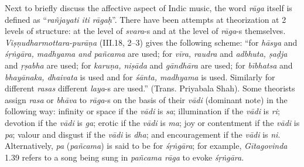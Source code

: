 Next to briefly discuss the affective aspect of Indic music, the word \textsl{rāga} itself is defined as “\textsl{rañjayati iti rāgaḥ}”. There have been attempts at theorization at 2 levels of structure: at the level of \textsl{svara}-s and at the level of \textsl{rāga}-s themselves. \textsl{Viṣṇudharmottara-purāṇa} (III.18, \hbox{2--3}) gives the following scheme: “for \textsl{hāsya} and \textsl{śṛṅgāra, madhyama and pañcama} are used; for \textsl{vīra, raudra} and \textsl{adbhuta, ṣaḍja} and \textsl{ṛṣabha} are used; for \textsl{karuṇa, niṣāda} and \textsl{gāndhāra} are used; for \textsl{bībhatsa} and \textsl{bhayānaka, dhaivata} is used and for \textsl{śānta, madhyama} is used. Similarly for different \textsl{rasas} different \textsl{laya}-s are used.” (Trans. Priyabala Shah). Some theorists assign \textsl{rasa} or \textsl{bhāva} to \textsl{rāga}-s on the basis of their \textsl{vādi} (dominant note) in the following way: infinity or space if the \textsl{vādi} is \textsl{sa}; illumination if the \textsl{vādi} is \textsl{ri}; devotion if the \textsl{vādi} is \textsl{ga}; erotic if the \textsl{vādi} is \textsl{ma}; joy or contentment if the \textsl{vādi} is \textsl{pa}; valour and disgust if the \textsl{vādi} is \textsl{dha}; and encouragement if the \textsl{vādi} is \textsl{ni}. Alternatively, \textsl{pa} (\textsl{pañcama}) is said to be for \textsl{śṛṅgāra}; for example, \textsl{Gītagovinda} 1.39 refers to a song being sung in \textsl{pañcama rāga} to evoke \textsl{śṛṅgāra}.


